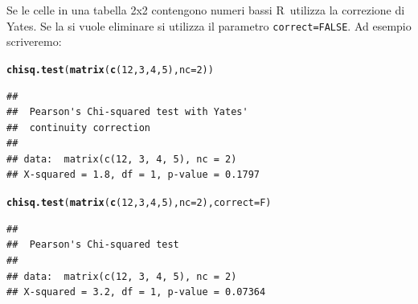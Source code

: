 \documentclass[onecolumn,12pt]{book}\usepackage[]{graphicx}\usepackage[]{color}
\makeatletter
\newcommand{\hlnum}[1]{\textcolor[rgb]{0.686,0.059,0.569}{#1}}%
\newcommand{\hlstd}[1]{\textcolor[rgb]{0.345,0.345,0.345}{#1}}%
\newcommand{\hlkwc}[1]{\textcolor[rgb]{0.333,0.667,0.333}{#1}}%
\newcommand{\hlkwd}[1]{\textcolor[rgb]{0.737,0.353,0.396}{\textbf{#1}}}%
\newenvironment{kframe}{%
 \def\at@end@of@kframe{}%
 \ifinner\ifhmode%
  \def\at@end@of@kframe{\end{minipage}}%
  \begin{minipage}{\columnwidth}%
 \fi\fi%
 \def\FrameCommand##1{\hskip\@totalleftmargin \hskip-\fboxsep
 \colorbox{shadecolor}{##1}\hskip-\fboxsep
     \hskip-\linewidth \hskip-\@totalleftmargin \hskip\columnwidth}%
 \MakeFramed {\advance\hsize-\width
   \@totalleftmargin\z@ \linewidth\hsize
   \@setminipage}}%
 {\par\unskip\endMakeFramed%
 \at@end@of@kframe}
\newenvironment{knitrout}{}{} %
\newcommand{\rpr}{\textsf{R}~}
\makeatother
\begin{document}
Se le celle in una tabella 2x2 contengono numeri bassi \rpr  utilizza la correzione di Yates. Se la si vuole eliminare  si utilizza il parametro  \texttt{correct=FALSE}.
Ad esempio scriveremo:
\begin{knitrout}
\color{fgcolor}\begin{kframe}
\begin{alltt}
\hlkwd{chisq.test}\hlstd{(}\hlkwd{matrix}\hlstd{(}\hlkwd{c}\hlstd{(}\hlnum{12}\hlstd{,}\hlnum{3}\hlstd{,}\hlnum{4}\hlstd{,}\hlnum{5}\hlstd{),}\hlkwc{nc}\hlstd{=}\hlnum{2}\hlstd{))}
\end{alltt}


{\ttfamily\noindent\color{warningcolor}{\#\# Warning in chisq.test(matrix(c(12, 3, 4, 5), nc = 2)): Chi-squared approximation may be incorrect}}\begin{verbatim}
## 
## 	Pearson's Chi-squared test with Yates'
## 	continuity correction
## 
## data:  matrix(c(12, 3, 4, 5), nc = 2)
## X-squared = 1.8, df = 1, p-value = 0.1797
\end{verbatim}
\begin{alltt}
\hlkwd{chisq.test}\hlstd{(}\hlkwd{matrix}\hlstd{(}\hlkwd{c}\hlstd{(}\hlnum{12}\hlstd{,}\hlnum{3}\hlstd{,}\hlnum{4}\hlstd{,}\hlnum{5}\hlstd{),}\hlkwc{nc}\hlstd{=}\hlnum{2}\hlstd{),}\hlkwc{correct}\hlstd{=F)}
\end{alltt}


{\ttfamily\noindent\color{warningcolor}{\#\# Warning in chisq.test(matrix(c(12, 3, 4, 5), nc = 2), correct = F): Chi-squared approximation may be incorrect}}\begin{verbatim}
## 
## 	Pearson's Chi-squared test
## 
## data:  matrix(c(12, 3, 4, 5), nc = 2)
## X-squared = 3.2, df = 1, p-value = 0.07364
\end{verbatim}
\end{kframe}
\end{knitrout}
\end{document}
